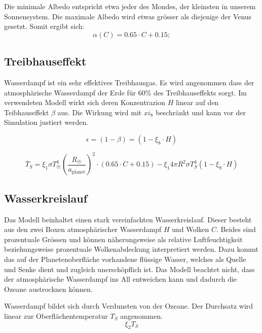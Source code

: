 \begin{refsection}
Die minimale Albedo entspricht etwa jeder des Mondes, der kleinsten in unserem Sonnensystem. Die maximale Albedo wird etwas grösser als diejenige der Venus gesetzt. Somit ergibt sich: 
\begin{equation}
\alpha(C) = 0.65 \cdot C + 0.15;
\end{equation}

\subsection{Treibhauseffekt}

Wasserdampf ist ein sehr effektives Treibhausgas. Es wird angenommen dass der atmosphärische Wasserdampf der Erde für 60\% des Treibhauseffekts sorgt.  
Im verwendeten Modell wirkt sich deren Konzentrazion $H$ linear auf den Teibhauseffekt $\beta$ aus. Die Wirkung wird mit $xi_8$ beschränkt und kann vor der Simulation justiert werden.

\begin{equation}
\epsilon  = (1 - \beta) = (1 - \xi_8 \cdot H)
\end{equation}

\begin{equation}
\dot{T_S} = \xi_1 \sigma T_{\astrosun}^4 \left( \frac{R_{\astrosun}}{a_{\text{planet}}} \right) ^2 \cdot (0.65 \cdot C + 0.15) - \xi_1 4 \pi R^2 \sigma T_{S}^4  (1 - \xi_8 \cdot H)
\end{equation}

\subsection{Wasserkreislauf}

Das Modell beinhaltet einen stark vereinfachten Wasserkreislauf. Dieser besteht aus den zwei Boxen atmosphärischer Wasserdampf $H$ und Wolken $C$. Beides sind prozentuale Grössen und können näherungsweise als relative Luftfeuchtigkeit beziehungsweise prozentuale Wolkenabdeckung interpretiert werden. Dazu kommt das auf der Planetenoberfläche vorhandene flüssige Wasser, welches als Quelle und Senke dient und zugleich unerschöpflich ist. Das Modell beachtet nicht, dass der atmosphärische Wasserdampf ins All entweichen kann und dadurch die Ozeane austrocknen können.


Wasserdampf bildet sich durch Verdunsten von der Ozeane. Der Durchsatz wird linear zur Oberflächentemperatur $T_S$ angenommen.
\begin{equation}
\xi_2 T_S
\end{equation}


\end{refsection}
